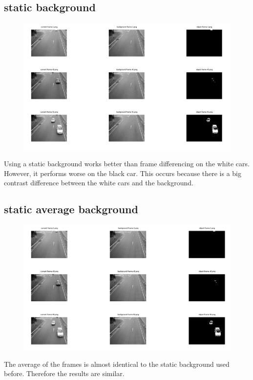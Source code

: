 \documentclass{article}
\begin{document}
	\subsection{static background}
	\begin{figure}[H]
		\includegraphics[width=\linewidth]{Q2/partB/partB.png}
	\end{figure}
	Using a static background works better than frame differencing on the white cars. However, it performs worse on the black car. This occurs because there is a big contrast difference between the white cars and the background.
	
	\subsection{static average background}
	\begin{figure}[H]
		\includegraphics[width=\linewidth]{Q2/partC/partC.png}
	\end{figure}
	The average of the frames is almost identical to the static background used before. Therefore the results are similar.
	
\end{document}
